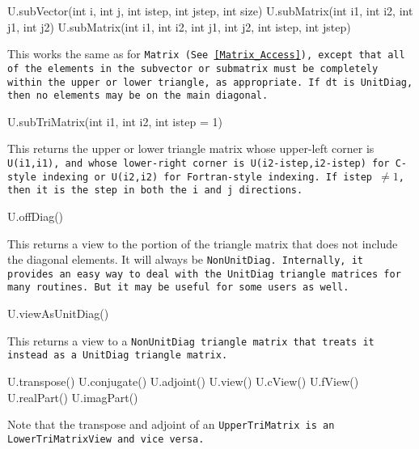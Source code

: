 \begin{tmvcode}
U.subVector(int i, int j, int istep, int jstep, int size)
U.subMatrix(int i1, int i2, int j1, int j2)
U.subMatrix(int i1, int i2, int j1, int j2, int istep, int jstep)
\end{tmvcode}
This works the same as for \tt{Matrix}
(See \ref{Matrix_Access}),
except that all of the elements in the 
subvector or submatrix must be completely within the upper or lower triangle, as
appropriate.  If \tt{dt} is \tt{UnitDiag}, then no elements may be on the 
main diagonal.

\begin{tmvcode}
U.subTriMatrix(int i1, int i2, int istep = 1)
\end{tmvcode}
This returns the upper or lower triangle matrix whose upper-left
corner is \tt{U(i1,i1)}, and whose lower-right corner is 
\tt{U(i2-istep,i2-istep)} for C-style indexing or \tt{U(i2,i2)} 
for Fortran-style indexing.  If \tt{istep} $\neq 1$, then it is the 
step in both the \tt{i} and \tt{j} directions.

\begin{tmvcode}
U.offDiag()
\end{tmvcode}
This returns a view to the portion of the triangle matrix that does not include
the diagonal elements.  It will always be \tt{NonUnitDiag}.
Internally, it provides an easy way to deal with the \tt{UnitDiag} triangle matrices
for many routines.  But it may be useful for some users as well.

\begin{tmvcode}
U.viewAsUnitDiag()
\end{tmvcode}
This returns a view to a \tt{NonUnitDiag} triangle matrix that treats it
instead as a \tt{UnitDiag} triangle matrix.

\begin{tmvcode}
U.transpose()
U.conjugate()
U.adjoint()
U.view()
U.cView()
U.fView()
U.realPart()
U.imagPart()
\end{tmvcode}
Note that the transpose and adjoint of an \tt{UpperTriMatrix} is an
\tt{LowerTriMatrixView} and vice versa.
\vspace{12pt}


